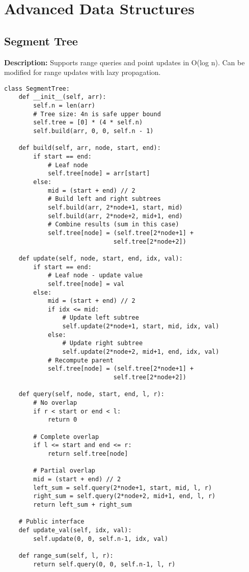 \section{Advanced Data Structures}

\subsection{Segment Tree}
\textbf{Description:} Supports range queries and point updates in O(log n). Can be modified for range updates with lazy propagation.

\begin{lstlisting}
class SegmentTree:
    def __init__(self, arr):
        self.n = len(arr)
        # Tree size: 4n is safe upper bound
        self.tree = [0] * (4 * self.n)
        self.build(arr, 0, 0, self.n - 1)
    
    def build(self, arr, node, start, end):
        if start == end:
            # Leaf node
            self.tree[node] = arr[start]
        else:
            mid = (start + end) // 2
            # Build left and right subtrees
            self.build(arr, 2*node+1, start, mid)
            self.build(arr, 2*node+2, mid+1, end)
            # Combine results (sum in this case)
            self.tree[node] = (self.tree[2*node+1] + 
                              self.tree[2*node+2])
    
    def update(self, node, start, end, idx, val):
        if start == end:
            # Leaf node - update value
            self.tree[node] = val
        else:
            mid = (start + end) // 2
            if idx <= mid:
                # Update left subtree
                self.update(2*node+1, start, mid, idx, val)
            else:
                # Update right subtree
                self.update(2*node+2, mid+1, end, idx, val)
            # Recompute parent
            self.tree[node] = (self.tree[2*node+1] + 
                              self.tree[2*node+2])
    
    def query(self, node, start, end, l, r):
        # No overlap
        if r < start or end < l:
            return 0
        
        # Complete overlap
        if l <= start and end <= r:
            return self.tree[node]
        
        # Partial overlap
        mid = (start + end) // 2
        left_sum = self.query(2*node+1, start, mid, l, r)
        right_sum = self.query(2*node+2, mid+1, end, l, r)
        return left_sum + right_sum
    
    # Public interface
    def update_val(self, idx, val):
        self.update(0, 0, self.n-1, idx, val)
    
    def range_sum(self, l, r):
        return self.query(0, 0, self.n-1, l, r)
\end{lstlisting}

